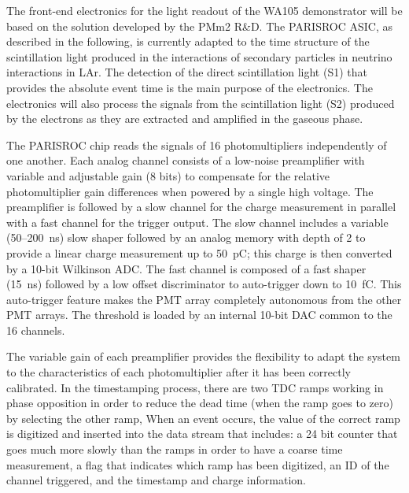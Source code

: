 The front-end electronics for the light readout of the WA105
demonstrator will be based on the solution developed by the PMm2
R\&D. The PARISROC ASIC, as described in the following, is currently
adapted to the time structure of the scintillation light produced in
the interactions of secondary particles in neutrino interactions in
LAr. The detection of the direct scintillation light (S1) that provides the absolute event time
 is the main
purpose of the electronics.  The
electronics will also process the signals from the scintillation
light (S2) produced by the electrons as they are extracted and amplified in
the gaseous phase. 

The PARISROC chip reads the signals of 16 photomultipliers %
independently of one another. Each analog channel consists of a
low-noise preamplifier with variable and adjustable gain (8 bits) to
compensate for the relative photomultiplier gain differences when powered by a
single high voltage. The preamplifier is followed by a slow channel
for the charge measurement in parallel with a fast channel for the
trigger output. The slow channel includes a variable (50--200~ns) slow
shaper followed by an analog memory with depth of 2 to provide a
linear charge measurement up to 50~pC; this charge is then converted
by a 10-bit Wilkinson ADC. The fast channel is composed of a fast
shaper (15~ns) followed by a low offset discriminator to auto-trigger
down to 10~fC. This auto-trigger feature makes the PMT array
completely autonomous from  the other PMT arrays. The threshold is
loaded by an internal 10-bit DAC common to the 16 channels.


The variable gain of each preamplifier provides the flexibility to
adapt the system to the characteristics of each %
photomultiplier after it has been correctly calibrated. In %
the timestamping process, there are two TDC ramps working in phase 
opposition in order to reduce %
the dead time (when the ramp goes to zero) by selecting the other ramp,  When an event occurs, the value of the correct ramp is
digitized and inserted into the data stream that includes: a 24 bit
counter that goes much more slowly than the ramps in order to have a coarse time
measurement, a flag that indicates which ramp has been digitized, an
ID of the channel triggered, and the timestamp and charge information.

